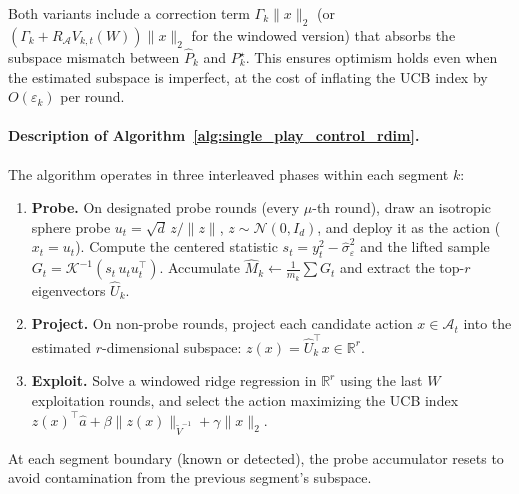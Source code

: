 \documentclass{article}
\newcommand{\R}{\mathbb{R}}
\newcommand{\cA}{\mathcal{A}}
\begin{document}
  Both variants include a correction term $\Gamma_k \|x\|_2$ (or
  $(\Gamma_k + R_{\cA} V_{k,t}(W))\|x\|_2$ for the windowed version) that absorbs
  the subspace mismatch between $\widehat P_k$ and $P_k^\star$.
  This ensures optimism holds even when the estimated subspace is imperfect,
  at the cost of inflating the UCB index by $O(\varepsilon_k)$ per round.


\paragraph{Description of Algorithm~\ref{alg:single_play_control_rdim}.}
The algorithm operates in three interleaved phases within each segment $k$:
\begin{enumerate}[nosep,leftmargin=2em]
  \item \textbf{Probe.} On designated probe rounds (every $\mu$-th round), draw an isotropic sphere probe $u_t = \sqrt{d}\,z/\|z\|$, $z \sim \mathcal{N}(0,I_d)$, and deploy it as the action ($x_t = u_t$). Compute the centered statistic $s_t = y_t^2 - \hat\sigma_\varepsilon^2$ and the lifted sample $G_t = \mathcal{K}^{-1}(s_t\,u_t u_t^\top)$. Accumulate $\widehat M_k \leftarrow \tfrac{1}{m_k}\sum G_t$ and extract the top-$r$ eigenvectors $\widehat U_k$.
  \item \textbf{Project.} On non-probe rounds, project each candidate action $x \in \cA_t$ into the estimated $r$-dimensional subspace: $z(x) = \widehat U_k^\top x \in \R^r$.
  \item \textbf{Exploit.} Solve a windowed ridge regression in $\R^r$ using the last $W$ exploitation rounds, and select the action maximizing the UCB index $z(x)^\top \hat a + \beta \|z(x)\|_{\widetilde V^{-1}} + \gamma \|x\|_2$.
\end{enumerate}
At each segment boundary (known or detected), the probe accumulator resets to avoid contamination from the previous segment's subspace.
\end{document}
